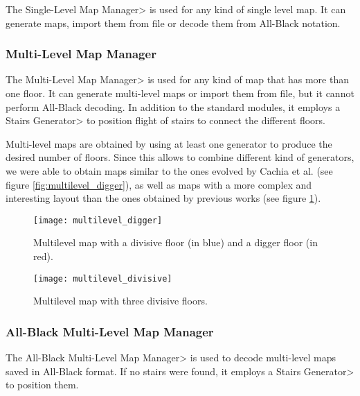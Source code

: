 The \<Single-Level Map Manager> is used for any kind of single level map. It can generate maps, import them from file or decode them from All-Black notation.

\subsubsection{Multi-Level Map Manager}

The \<Multi-Level Map Manager> is used for any kind of map that has more than one floor. It can generate multi-level maps or import them from file, but it cannot perform All-Black decoding. In addition to the standard modules, it employs a \<Stairs Generator> to position flight of stairs to connect the different floors. 

\par

Multi-level maps are obtained by using at least one generator to produce the desired number of floors. Since this allows to combine different kind of generators, we were able to obtain maps similar to the ones evolved by Cachia et al.\cite{MultiLevelEvolution} (see figure \ref{fig:multilevel_digger}), as well as maps with a more complex and interesting layout than the ones obtained by previous works (see figure \ref{fig:multilevel_divisive}).

\begin{figure}[tb]
\begin{minipage}[t]{0.48\linewidth}
	\texttt{[image: multilevel\_digger]}
	\caption{Multilevel map with a divisive floor (in blue) and a digger floor (in red).}
	\label{fig:multilevel_digger}
\end{minipage}
\begin{minipage}[t]{0.48\linewidth}
	\texttt{[image: multilevel\_divisive]}
	\caption{Multilevel map with three divisive floors.}
	\label{fig:multilevel_divisive}
\end{minipage}
\end{figure}

\subsubsection{All-Black Multi-Level Map Manager}

The \<All-Black Multi-Level Map Manager> is used to decode multi-level maps saved in All-Black format. If no stairs were found, it employs a \<Stairs Generator> to position them.


